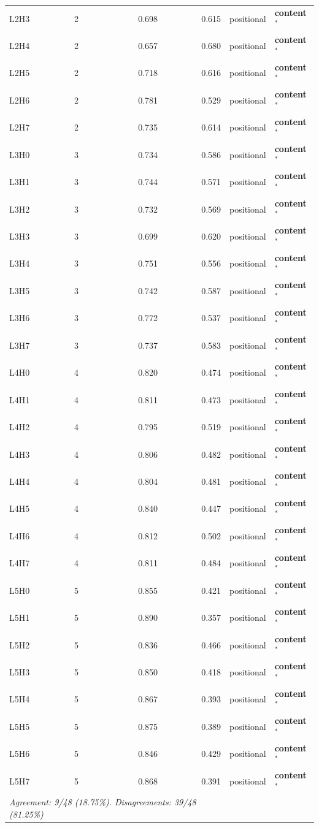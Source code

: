 \begin{table}[p]
\begin{tabular}{llrrll}
L2H3 & 2 & 0.698 & 0.615 & positional & \textbf{content}$^*$ \\
L2H4 & 2 & 0.657 & 0.680 & positional & \textbf{content}$^*$ \\
L2H5 & 2 & 0.718 & 0.616 & positional & \textbf{content}$^*$ \\
L2H6 & 2 & 0.781 & 0.529 & positional & \textbf{content}$^*$ \\
L2H7 & 2 & 0.735 & 0.614 & positional & \textbf{content}$^*$ \\
\midrule
L3H0 & 3 & 0.734 & 0.586 & positional & \textbf{content}$^*$ \\
L3H1 & 3 & 0.744 & 0.571 & positional & \textbf{content}$^*$ \\
L3H2 & 3 & 0.732 & 0.569 & positional & \textbf{content}$^*$ \\
L3H3 & 3 & 0.699 & 0.620 & positional & \textbf{content}$^*$ \\
L3H4 & 3 & 0.751 & 0.556 & positional & \textbf{content}$^*$ \\
L3H5 & 3 & 0.742 & 0.587 & positional & \textbf{content}$^*$ \\
L3H6 & 3 & 0.772 & 0.537 & positional & \textbf{content}$^*$ \\
L3H7 & 3 & 0.737 & 0.583 & positional & \textbf{content}$^*$ \\
\midrule
L4H0 & 4 & 0.820 & 0.474 & positional & \textbf{content}$^*$ \\
L4H1 & 4 & 0.811 & 0.473 & positional & \textbf{content}$^*$ \\
L4H2 & 4 & 0.795 & 0.519 & positional & \textbf{content}$^*$ \\
L4H3 & 4 & 0.806 & 0.482 & positional & \textbf{content}$^*$ \\
L4H4 & 4 & 0.804 & 0.481 & positional & \textbf{content}$^*$ \\
L4H5 & 4 & 0.840 & 0.447 & positional & \textbf{content}$^*$ \\
L4H6 & 4 & 0.812 & 0.502 & positional & \textbf{content}$^*$ \\
L4H7 & 4 & 0.811 & 0.484 & positional & \textbf{content}$^*$ \\
\midrule
L5H0 & 5 & 0.855 & 0.421 & positional & \textbf{content}$^*$ \\
L5H1 & 5 & 0.890 & 0.357 & positional & \textbf{content}$^*$ \\
L5H2 & 5 & 0.836 & 0.466 & positional & \textbf{content}$^*$ \\
L5H3 & 5 & 0.850 & 0.418 & positional & \textbf{content}$^*$ \\
L5H4 & 5 & 0.867 & 0.393 & positional & \textbf{content}$^*$ \\
L5H5 & 5 & 0.875 & 0.389 & positional & \textbf{content}$^*$ \\
L5H6 & 5 & 0.846 & 0.429 & positional & \textbf{content}$^*$ \\
L5H7 & 5 & 0.868 & 0.391 & positional & \textbf{content}$^*$ \\
\midrule
\multicolumn{4}{l}{\textit{Agreement: 9/48 (18.75\%). Disagreements: 39/48 (81.25\%)}} \\
\bottomrule
\end{tabular}
\end{table}

